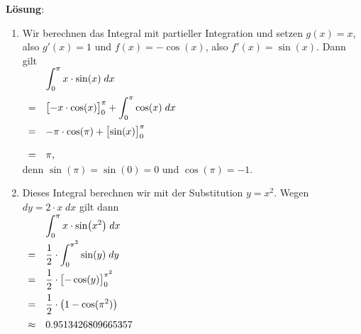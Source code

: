 \documentclass{article}
\newcommand{\ds}{\displaystyle}
\newcommand{\solution}{\vspace*{0.2cm}

\noindent
\textbf{L\"osung}: }
\begin{document}
\solution
\begin{enumerate}
\item Wir berechnen das Integral mit partieller Integration und setzen $g(x) = x$, also $g'(x) = 1$
      und $f(x) = -\cos(x)$, also $f'(x) = \sin(x)$.  Dann gilt
      \\[0.2cm]
      \hspace*{1.3cm}
      $
      \begin{array}[t]{cl}
         & \ds \int_{0}^{\pi} x \cdot \sin(x) \; dx                         \\[0.4cm]
       = & \ds \bigl[-x \cdot \cos(x)\bigr]_0^\pi + \int_0^\pi \cos(x)\; dx \\[0.4cm]
       = & \ds -\pi \cdot \cos(\pi) + \bigl[\sin(x)\bigr]_0^\pi            \\[0.4cm]
       = & \pi,
      \end{array}
      $
      \\[0.2cm]
      denn $\sin(\pi) = \sin(0) = 0$ und $\cos(\pi) = - 1$.
\item Dieses Integral berechnen wir mit der Substitution $y = x^2$.  Wegen $dy = 2 \cdot x \;dx$ gilt dann
      \\[0.2cm]
      \hspace*{1.3cm}   
      $
      \begin{array}[t]{cl}
         & \ds \int_{0}^{\pi} x \cdot \sin\bigl(x^2 \bigr) \; dx \\[0.3cm]
       = & \ds \frac{1}{2} \cdot \int_0^{\pi^2} \sin(y)\; dy     \\[0.3cm]  
       = & \ds \frac{1}{2} \cdot \bigl[-\cos(y)\bigr]_0^{\pi^2}  \\[0.3cm]
       = & \ds \frac{1}{2} \cdot \bigl(1 - \cos(\pi^2)\bigr)    \\[0.3cm]
       \approx & 0.9513426809665357
      \end{array}
      $
      \pagebreak


\end{enumerate}
\end{document}
